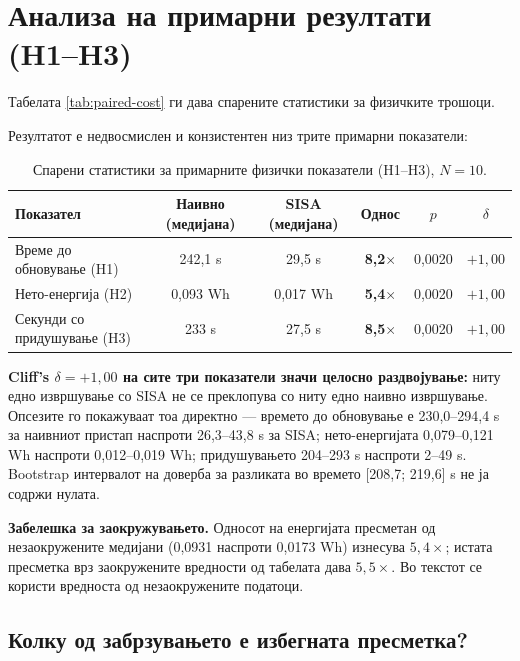 \section{Анализа на примарни резултати (H1–H3)}

Табелата \ref{tab:paired-cost} ги дава спарените статистики за физичките трошоци.



Резултатот е недвосмислен и конзистентен низ трите примарни показатели:

\begin{table}[htbp]
\centering
\caption{Спарени статистики за примарните физички показатели (H1--H3), $N = 10$.}
\label{tab:primary-results}
\begin{tabular}{lccccc}
\toprule
Показател & Наивно (медијана) & SISA (медијана) & Однос & $p$ & $\delta$ \\
\midrule
Време до обновување (H1) & 242,1 s & 29,5 s & \textbf{8,2$\times$} & 0,0020 & $+1{,}00$ \\
Нето-енергија (H2) & 0,093 Wh & 0,017 Wh & \textbf{5,4$\times$} & 0,0020 & $+1{,}00$ \\
Секунди со придушување (H3) & 233 s & 27,5 s & \textbf{8,5$\times$} & 0,0020 & $+1{,}00$ \\
\bottomrule
\end{tabular}
\end{table}

\textbf{Cliff's $\delta = +1{,}00$ на сите три показатели значи целосно раздвојување:} ниту едно
извршување со SISA не се преклопува со ниту едно наивно извршување. Опсезите го покажуваат
тоа директно --- времето до обновување е 230,0–294,4 s за наивниот пристап наспроти
26,3–43,8 s за SISA; нето-енергијата 0,079–0,121 Wh наспроти 0,012–0,019 Wh; придушувањето
204–293 s наспроти 2–49 s. Bootstrap интервалот на доверба за разликата во времето
[208,7; 219,6] s не ја содржи нулата.

\textbf{Забелешка за заокружувањето.} Односот на енергијата пресметан од незаокружените
медијани (0,0931 наспроти 0,0173 Wh) изнесува $5{,}4\times$; истата пресметка врз
заокружените вредности од табелата дава $5{,}5\times$. Во текстот се користи вредноста од
незаокружените податоци.

\subsection{Колку од забрзувањето е избегната пресметка?}

